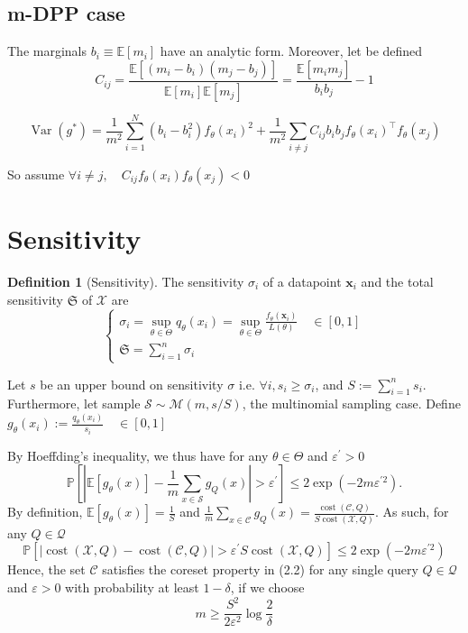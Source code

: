 \documentclass{article}
\theoremstyle{definition}
\newtheorem{definition}{Definition}[section]
\begin{document}
\subsection{m-DPP case}

The marginals $b_{i} \equiv \mathbb{E}\left[m_{i}\right]$ have an analytic form. Moreover, let be defined
$$
C_{i j}=\frac{\mathbb{E}\left[\left(m_{i}-b_{i}\right)\left(m_{j}-b_{j}\right)\right]}{\mathbb{E}\left[m_{i}\right] \mathbb{E}\left[m_{j}\right]}=\frac{\mathbb{E}\left[m_{i} m_{j}\right]}{b_{i} b_{j}}-1
$$

\begin{equation}
	\operatorname{Var}\left(g^{*}\right)=\frac{1}{m^{2}} \sum_{i=1}^{N}\left(b_{i}-b_{i}^{2}\right) f_\theta(x_i)^2
	+\frac{1}{m^{2}} \sum_{i \neq j} C_{i j} b_{i} b_{j} f_\theta(x_i)^{\top} f_\theta(x_j)
\end{equation}

So \cite{zhang2017dppminibatch} assume $\forall i\neq j, \quad  C_{ij}f_\theta(x_i)f_\theta(x_j) <0$

\section{Sensitivity}
\begin{definition}[Sensitivity]
	The sensitivity $\sigma_i$ of a datapoint $\boldsymbol{x}_{i}$ and the total sensitivity $\mathfrak S$ of $\mathcal X$ are
	$$
	\begin{cases}
		\sigma_{i}=\sup_{\theta \in \Theta} q_{\theta}(x_i) = \sup _{\theta \in \Theta} \frac{f_{\theta}\left(\boldsymbol{x}_{i}\right)}{L(\theta)} \quad \in[0,1]\\
		\mathfrak{S}=\sum_{i=1}^{n} \sigma_{i}
	\end{cases}
	$$
\end{definition} 

Let $s$ be an upper bound on sensitivity $\sigma$ i.e. $\forall i, s_i \geq \sigma_i$, and $S := \sum_{i=1}^n s_i$. Furthermore, let sample  $\mathcal S \sim \mathcal M(m, s/S)$, the multinomial sampling case. Define $g_\theta(x_i) := \frac{q_\theta(x_i)}{s_i}  \quad \in[0,1]$

By Hoeffding's inequality, we thus have for any $\theta \in \Theta$ and $\varepsilon^{\prime}>0$
$$
\mathbb{P}\left[\left|\mathbb{E}\left[g_{\theta}(x)\right]-\frac{1}{m} \sum_{x \in \mathcal{S}} g_{Q}(x)\right|>\varepsilon^{\prime}\right] \leq 2 \exp \left(-2 m \varepsilon^{\prime 2}\right) .
$$
By definition, $\mathbb{E}\left[g_{\theta}(x)\right]=\frac{1}{S}$ and $\frac{1}{m} \sum_{x \in \mathcal{C}} g_{Q}(x)=\frac{\operatorname{cost}(\mathcal{C}, Q)}{S \operatorname{cost}(\mathcal{X}, Q)}$. As such, for any $Q \in \mathcal{Q}$
$$
\mathbb{P}\left[|\operatorname{cost}(\mathcal{X}, Q)-\operatorname{cost}(\mathcal{C}, Q)|>\varepsilon^{\prime} S \operatorname{cost}(\mathcal{X}, Q)\right] \leq 2 \exp \left(-2 m \varepsilon^{\prime 2}\right)
$$
Hence, the set $\mathcal{C}$ satisfies the coreset property in (2.2) for any single query $Q \in \mathcal{Q}$ and $\varepsilon>0$ with probability at least $1-\delta$, if we choose
$$
m \geq \frac{S^{2}}{2 \varepsilon^{2}} \log \frac{2}{\delta}
$$
\end{document}
